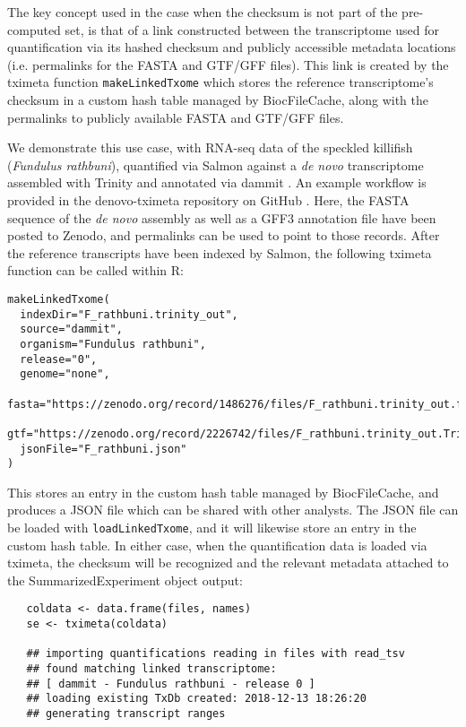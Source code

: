 \documentclass[12pt]{article} \usepackage[utf8]{inputenc}
\begin{document}
The key concept used in the case when the checksum is not part of the
pre-computed set, is that of a link constructed between the
transcriptome used for quantification via its hashed checksum and
publicly accessible metadata locations (i.e. permalinks for the FASTA
and GTF/GFF files). This link is created by the tximeta function
\texttt{makeLinkedTxome} which stores the reference transcriptome's
checksum in a custom hash table managed by BiocFileCache, along with
the permalinks to publicly available FASTA and GTF/GFF files.

We demonstrate this use case, with RNA-seq data of the speckled
killifish (\textit{Fundulus rathbuni}), quantified via Salmon
\citep{salmon} against a \textit{de novo} transcriptome assembled with
Trinity \citep{trinity} and annotated via dammit \citep{dammit}. An
example workflow is provided in the denovo-tximeta repository on
GitHub \citep{denovo}. Here, the FASTA sequence of the
\textit{de novo} assembly as well as a GFF3 annotation file have been
posted to Zenodo, and permalinks can be used to point to those
records. After the reference transcripts have been indexed by Salmon,
the following tximeta function can be called within R:

\begin{verbatim}
makeLinkedTxome(
  indexDir="F_rathbuni.trinity_out", 
  source="dammit",
  organism="Fundulus rathbuni", 
  release="0", 
  genome="none",
  fasta="https://zenodo.org/record/1486276/files/F_rathbuni.trinity_out.fasta",
  gtf="https://zenodo.org/record/2226742/files/F_rathbuni.trinity_out.Trinity.fasta.dammit.gff3",
  jsonFile="F_rathbuni.json"
)
\end{verbatim}


This stores an entry in the custom hash table managed by
BiocFileCache, and produces a JSON file which can be shared with other
analysts. The JSON file can be loaded with \texttt{loadLinkedTxome},
and it will likewise store an entry in the custom hash table. In
either case, when the quantification data is loaded via tximeta, the
checksum will be recognized and the relevant metadata attached to the
SummarizedExperiment object output:

\begin{verbatim}
   coldata <- data.frame(files, names) 
   se <- tximeta(coldata)

   ## importing quantifications reading in files with read_tsv
   ## found matching linked transcriptome: 
   ## [ dammit - Fundulus rathbuni - release 0 ] 
   ## loading existing TxDb created: 2018-12-13 18:26:20 
   ## generating transcript ranges
\end{verbatim}
\end{document}
